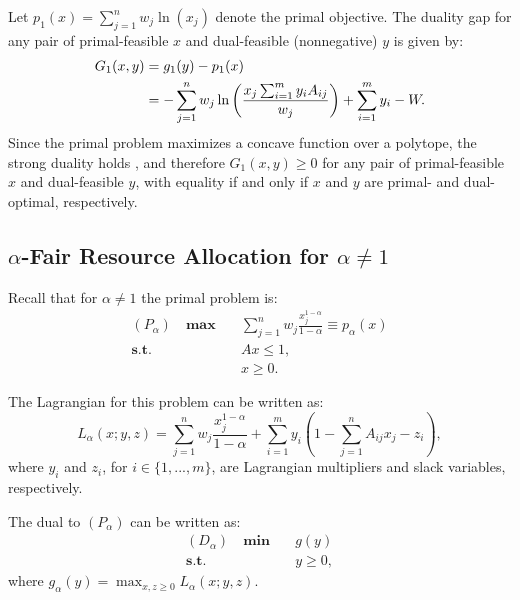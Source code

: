 \documentclass[11pt]{article}
\begin{document}
Let $p_1(x) = \sum_{j=1}^n w_j \ln(x_j)$ denote the primal objective. The duality gap for any pair of primal-feasible $x$ and dual-feasible (nonnegative) $y$ is given by:
\begin{align*}
G_1(x, y) &= g_1(y) - p_1(x)\notag\\
&= - \sum_{j=1}^n w_j \ln\left(\frac{x_j\sum_{i=1}^m y_i A_{ij}}{w_j}\right)+\sum_{i=1}^m y_i -W.
\end{align*}
Since the primal problem maximizes a concave function over a polytope, the strong duality holds \cite{boyd2009convex}, and therefore $G_1(x, y)\geq 0$ for any pair of primal-feasible $x$ and dual-feasible $y$, with equality if and only if $x$ and $y$ are primal- and dual- optimal, respectively.

\subsection{$\alpha$-Fair Resource Allocation for $\alpha\neq 1$}

Recall that for $\alpha\neq 1$ the primal problem is:
\begin{align*}
{(P_\alpha)}\quad\textbf{max} \quad&\sum_{j=1}^n w_j\frac{x_j^{1-\alpha}}{1-\alpha}\equiv p_{\alpha}(x)\\
\textbf{s.t.}\quad& Ax \leq 1,\\
&x\geq 0.
\end{align*}

The Lagrangian for this problem can be written as:
\begin{equation*}
L_{\alpha}(x; y, z) = \sum_{j=1}^n w_j\frac{x_j^{1-\alpha}}{1-\alpha}+\sum_{i=1}^m y_i\left(1 - \sum_{j=1}^n A_{ij}x_j - z_i\right),
\end{equation*}
where $y_i$ and $z_i$, for $i\in \{1,...,m\}$, are Lagrangian multipliers and slack variables, respectively.

The dual to $(P_\alpha)$ can be written as:
\begin{align*}
{(D_\alpha)}\quad\textbf{min} \quad&g(y)\\
\textbf{s.t.}\quad& y\geq 0,
\end{align*}
where $g_{\alpha}(y) = \max_{x, z \geq 0} L_{\alpha}(x; y, z)$.
\end{document}
